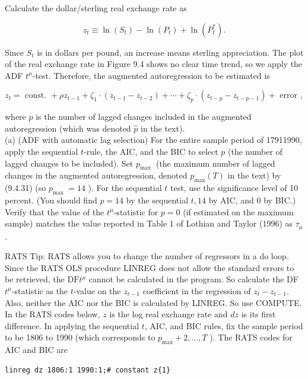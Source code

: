 \documentclass[10pt]{article}
\begin{document}
Calculate the dollar/sterling real exchange rate as


\begin{equation*}
z_{t} \equiv \ln \left(S_{t}\right)-\ln \left(P_{t}\right)+\ln \left(P_{t}^{*}\right) . \tag{1}
\end{equation*}


Since $S_{t}$ is in dollars per pound, an increase means sterling appreciation. The plot of the real exchange rate in Figure 9.4 shows no clear time trend, so we apply the ADF $t^{\mu}$-test. Therefore, the augmented autoregression to be estimated is


\begin{equation*}
z_{t}=\text { const. }+\rho z_{t-1}+\zeta_{1} \cdot\left(z_{t-1}-z_{t-2}\right)+\cdots+\zeta_{p} \cdot\left(z_{t-p}-z_{t-p-1}\right)+\text { error }, \tag{2}
\end{equation*}


where $p$ is the number of lagged changes included in the augmented autoregression (which was denoted $\hat{p}$ in the text).\\
(a) (ADF with automatic lag selection) For the entire sample period of 17911990, apply the sequential $t$-rule, the AIC, and the BIC to select $p$ (the number of lagged changes to be included). Set $p_{\text {max }}$ (the maximum number of lagged changes in the augmented autoregression, denoted $p_{\max }(T)$ in the text) by (9.4.31) (so $p_{\text {max }}=14$ ). For the sequential $t$ test, use the significance level of 10 percent. (You should find $p=14$ by the sequential $t, 14$ by AIC, and 0 by BIC.) Verify that the value of the $t^{\mu}$-statistic for $p=0$ (if estimated on the maximum sample) matches the value reported in Table 1 of Lothian and Taylor (1996) as $\tau_{\mu}$.

RATS Tip: RATS allows you to change the number of regressors in a do loop. Since the RATS OLS procedure LINREG does not allow the standard errors to be retrieved, the $\mathrm{DF} t^{\mu}$ cannot be calculated in the program. So calculate the DF $t^{\mu}$-statistic as the $t$-value on the $z_{t-1}$ coefficient in the regression of $z_{t}-z_{t-1}$. Also, neither the AIC nor the BIC is calculated by LINREG. So use COMPUTE. In the RATS codes below, $z$ is the log real exchange rate and $d z$ is its first difference. In applying the sequential $t$, AIC, and BIC rules, fix the sample period to be 1806 to 1990 (which corresponds to $p_{\max }+2, \ldots, T$ ). The RATS codes for AIC and BIC are

\begin{verbatim}
linreg dz 1806:1 1990:1;# constant z{1}
\end{verbatim}
\end{document}
